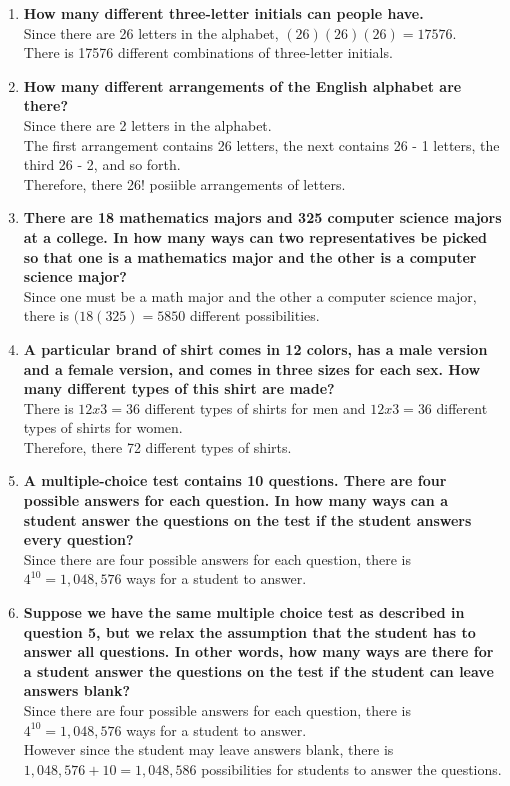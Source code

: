 \documentclass[11pt]{article}
\begin{document}
\begin{enumerate}

\item
\textbf{How many different three-letter initials can people have.}\\
Since there are 26 letters in the alphabet, $(26)(26)(26)=17576$.\\
There is 17576 different combinations of three-letter initials.\\

\item
\textbf{How many different arrangements of the English alphabet are there?}\\
Since there are 2 letters in the alphabet.\\
The first arrangement contains 26 letters, the next contains 26 - 1 letters, the third 26 - 2, and so forth.\\
Therefore, there 26! posiible arrangements of letters.\\ 

\item
\textbf{There are 18 mathematics majors and 325 computer science majors at a college. In how many ways can two representatives be picked so that one is a mathematics major and the other is a computer science major?}\\
Since one must be a math major and the other a computer science major, there is $(18(325)=5850$ different possibilities.\\

\item
\textbf{A particular brand of shirt comes in 12 colors, has a male version and a female version, and comes in three sizes for each sex.  How many different types of this shirt are made?}\\
There is $12x3=36$ different types of shirts for men and $12x3=36$ different types of shirts for women.\\
Therefore, there 72 different types of shirts.\\

\item
\textbf{A multiple-choice test contains 10 questions.  There are four possible answers for each question.  In how many ways can a student answer the questions on the test if the student answers every question?}\\
Since there are four possible answers for each question, there is $4^{10}=1,048,576$ ways for a student to answer.\\

\item
\textbf{Suppose we have the same multiple choice test as described in question 5, but we relax the assumption that the student has to answer all questions.  In other words, how many ways are there for a student answer the questions on the test if the student can leave answers blank?}\\
Since there are four possible answers for each question, there is $4^{10}=1,048,576$ ways for a student to answer.\\
However since the student may leave answers blank, there is $1,048,576 + 10 = 1,048,586$ possibilities for students to answer the questions.\\ 
\end{enumerate}
\end{document}
